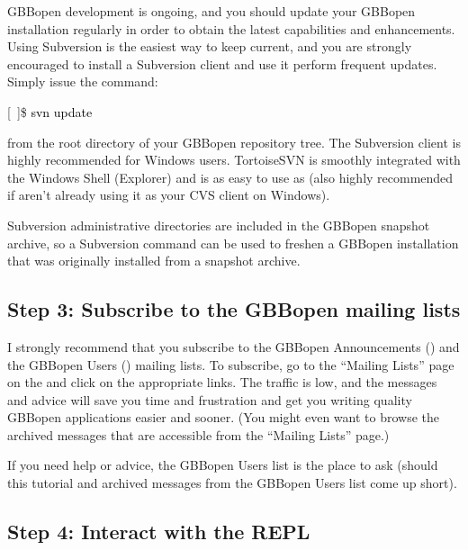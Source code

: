 \documentclass[10pt,twoside,english,pdftex]{article}
\begin{document}
%
%
%
%
%
GBBopen development is ongoing, and you should update your GBBopen
installation regularly in order to obtain the latest capabilities and
enhancements.  Using Subversion is the easiest way to keep current, and you
are strongly encouraged to install a Subversion client and use it perform
frequent updates.  Simply issue the command:
%
\W\supp
\begin{example}
\textcolor{darkergray}{%
  [~]\$ \textcolor{black}{svn update}}
\end{example}
%
from the root directory of your GBBopen repository tree.  
The  Subversion
client is highly recommended for Windows users.  TortoiseSVN is
smoothly integrated with the Windows Shell (Explorer) and is as easy
to use as  (also
highly recommended if aren't already using it as your CVS client on
Windows).

Subversion  administrative directories are included in the
GBBopen snapshot archive, so a Subversion  command can be
used to freshen a GBBopen installation that was originally installed
from a snapshot archive.

\subsection*{Step 3: Subscribe to the GBBopen mailing lists}

%
I strongly recommend that you subscribe to the GBBopen Announcements
() and the GBBopen Users
() mailing lists.  To subscribe, go to the ``Mailing
Lists'' page on the  and
click on the appropriate  links.  The traffic is low, and the
messages and advice will save you time and frustration and get you writing
quality GBBopen applications easier and sooner.  (You might even want to
browse the archived messages that are accessible from the ``Mailing Lists''
page.)

If you need help or advice, the GBBopen Users list is the place to ask (should
this tutorial and archived messages from the GBBopen Users list come up
short).

\subsection*{Step 4: Interact with the REPL}
\end{document}

